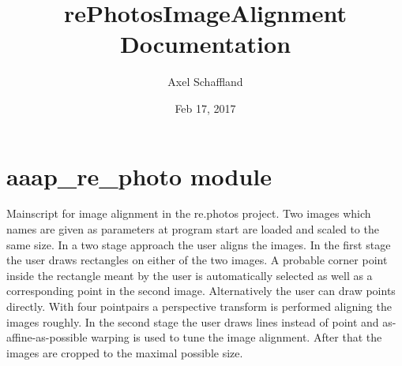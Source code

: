 \documentclass[letterpaper,10pt,english]{sphinxmanual}
\title{rePhotosImageAlignment Documentation}
\date{Feb 17, 2017}
\author{Axel Schaffland}
\begin{document}
\maketitle
\sphinxtableofcontents
{}\label{\detokenize{index::doc}}



\chapter{aaap\_re\_photo module}
\label{\detokenize{aaap_re_photo:aaap-re-photo-module}}\label{\detokenize{aaap_re_photo::doc}}\label{\detokenize{aaap_re_photo:welcome-to-rephotosimagealignment-s-documentation}}\label{\detokenize{aaap_re_photo:module-aaap_re_photo}}
Mainscript for image alignment in the re.photos project.
Two images which names are given as parameters at program start are loaded and
scaled to the same size. In a two stage approach the user aligns the images. In
the first stage the user draws rectangles on either of the two images. A
probable corner point inside the rectangle meant by the user is automatically
selected as well as a corresponding point in the second image. Alternatively the
user can draw points directly. With four pointpairs a perspective transform is
performed aligning the images roughly. In the second stage the user draws lines
instead of point and as-affine-as-possible warping is used to tune the image
alignment. After that the images are cropped to the maximal possible size.
\end{document}
